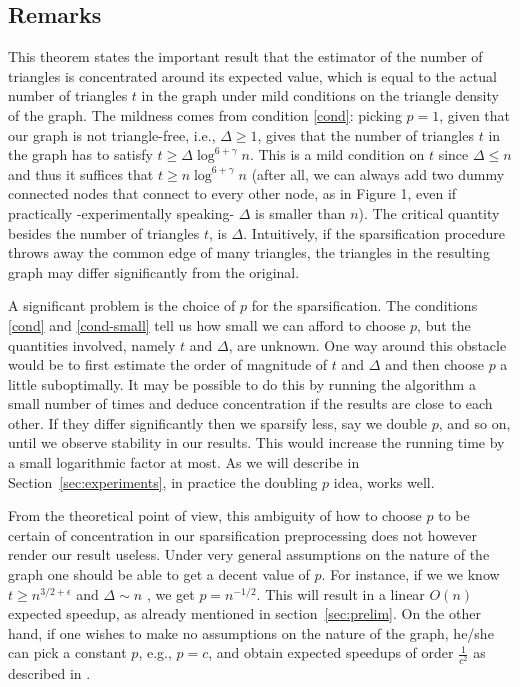 \documentclass{llncs}
\newcommand{\hide}[1]{}
\begin{document}
\subsection{Remarks}

This theorem states the important result that the estimator of the number of triangles is concentrated around its expected value, which 
is equal to the actual number of triangles $t$ in the graph \cite{Tsourakakiskdd09} under mild conditions on the triangle density of the
graph. The mildness comes from condition \eqref{cond}: picking $p=1$, given that our graph is not triangle-free, i.e., $\Delta \geq 1$,
gives that the number of triangles $t$ in the graph has to satisfy $t \geq \Delta \log^{6+\gamma} n$. 
This is a mild condition on $t$ since  $\Delta \leq n$ and thus it suffices that $t \geq n \log^{6+\gamma} n $ 
(after all, we can always add two dummy connected nodes that connect to every other node, as in Figure 1,
even if practically -experimentally speaking- $\Delta$ is smaller than $n$). 
The critical quantity besides the number of triangles $t$, is $\Delta$. Intuitively, if the sparsification
procedure throws away the common edge of many triangles, the triangles in the resulting graph may differ significantly
from the original. 

A significant problem is the choice of $p$ for the sparsification. The conditions \eqref{cond} and \eqref{cond-small} tell us how small we can afford to choose $p$, but the quantities involved, namely $t$ and $\Delta$, are unknown. One way around this obstacle would be to first estimate the order of magnitude of $t$ and $\Delta$ and then choose $p$ a little suboptimally. It may be possible to do this by running the algorithm a small number of times and deduce concentration if the results are close to each other. If they differ significantly then we sparsify less, say we double $p$, and so on, until we observe stability in our results. This would increase the running time by a small logarithmic factor at most. As we will describe in Section~\ref{sec:experiments}, in practice the doubling $p$ idea, works well. \hide{since concentration is achieved for small $p$ values, ranging from $0.005$ to $0.02$. Notice the corresponding expected speedups if one uses a simple counting algorithm like the node iterator \cite{Tsourakakiskdd09} are  2,500 to 40,000.}

From the theoretical point of view, this ambiguity of how to choose $p$ to be certain of concentration in our sparsification preprocessing does not however render our result useless. Under very general assumptions on the nature of the graph one should be able to get a decent value of $p$. For instance, if we we know $t \ge n^{3/2+\epsilon}$ and $\Delta\sim n$ , we get $p = n^{-1/2}$. This will result in a linear $O(n)$ expected speedup, as already mentioned in section~\ref{sec:prelim}.
On the other hand, if one wishes to make no assumptions on the nature of the graph, he/she can pick a constant $p$, e.g., $p=c$, and obtain expected speedups of order $\frac{1}{c^2}$ as described in \cite{Tsourakakiskdd09}. 
\end{document}
